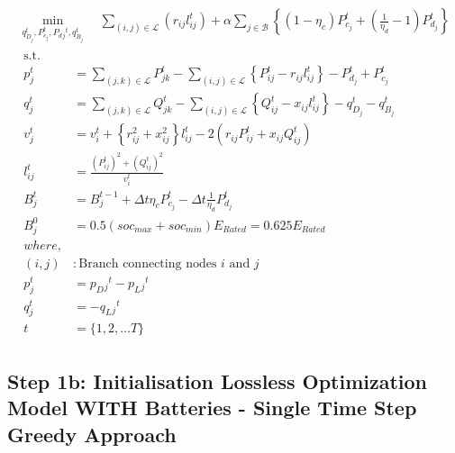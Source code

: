 \begin{gather}
    \min_{q_{D_j}^t, 
	P_{c_j}^t, P_d{_j}^t, q_{B_j}^t} \quad
	\sum_{(i, j) \in \mathcal{L}} (r_{ij}l_{ij}^t) + 
	\alpha \sum_{j \in \mathcal{B}} \left\{ (1- \eta_c)P_{c_j}^t + \left(\frac{1}{\eta_d}-1\right) P_{d_j}^t \right\} \\
	\begin{align}
		\text{s.t.} & {}\nonumber \\
		{p_j^t} & = {\sum_{(j, k) \in \mathcal{L}} P_{jk}^t - \sum_{(i, j) \in \mathcal{L}}\left\{P_{ij}^t - r_{ij}l_{ij}^t\right\} - P_{d_j}^t + P_{c_j}^t} && \\
		{q_j^t} & = {\sum_{(j, k) \in \mathcal{L}} Q_{jk}^t - \sum_{(i, j) \in \mathcal{L}}\left\{Q_{ij}^t - x_{ij}l_{ij}^t\right\} - q_{D_j}^t - q_{B_j}^t} && \\
		{v_j^t} & = {v_{i}^t +  \left\{r_{ij}^2 + x_{ij}^2\right\}l_{ij}^t - 2(r_{ij}P_{ij}^t + x_{ij}Q_{ij}^t)} && \\
		{l_{ij}^t} & = {\frac{(P_{ij}^{t})^2 + (Q_{ij}^{t})^2}{v_i^t}} \\
		{B_{j}^{t}} &= {B_{j}^{t-1} + \Delta t \eta_c P_{c_j}^t - \Delta t\frac{1}{\eta_d} P_{d_j}^t} \\
		{ B_{j}^{0} } &= { 0.5(soc_{max}+soc_{min})E_{Rated} = 0.625E_{Rated}} \\
		{where,} & {} \\
		{(i, j)} &: {\text{Branch connecting nodes $i$ and $j$}} \\
		{p_j^t} &= {p_D{_j}^t - p_L{_j}^t} \\
		{q_j^t} &= {-q_L{_j}^t} \\
		{t} &= {\{1, 2, \ldots T\}}
	\end{align}
\end{gather}

\subsection*{Step 1b: Initialisation Lossless Optimization Model WITH Batteries - Single Time Step Greedy Approach}


